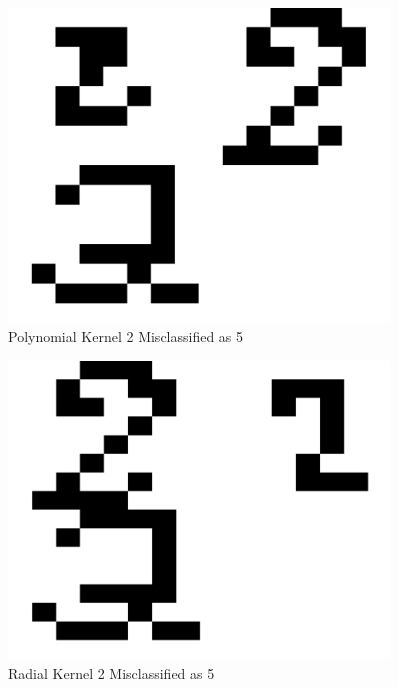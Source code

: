 \documentclass{article}
\begin{document}
\begin{figure}
\centering
\includegraphics[width=0.9\textwidth]{images/test2_5_correct2_class5_a0156.png}
\caption{Polynomial Kernel 2 Misclassified as 5}
\label{poly2errortest}
\end{figure}

\begin{figure}
\centering
\includegraphics[width=0.9\textwidth]{images/test2_5_correct2_class5_radial.png}
\caption{Radial Kernel 2 Misclassified as 5}
\label{radial2errortest}
\end{figure}
\end{document}
